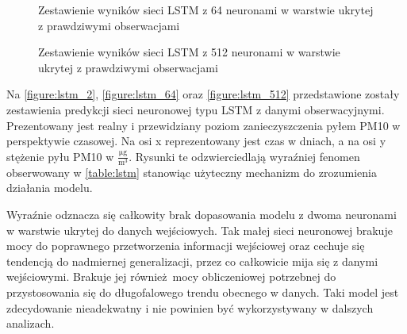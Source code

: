 \documentclass[10pt,a4paper]{article}
\begin{document}
\FloatBarrier
\begin{figure}[!ht]
	\centering
	\caption{Zestawienie wyników sieci LSTM z 64 neuronami w warstwie ukrytej z prawdziwymi obserwacjami}
	\label{figure:lstm_64}
\end{figure}
\FloatBarrier
\begin{figure}[!ht]
	\centering
	\caption{Zestawienie wyników sieci LSTM z 512 neuronami w warstwie ukrytej z prawdziwymi obserwacjami}
	\label{figure:lstm_512}
\end{figure}
\FloatBarrier

Na \autoref{figure:lstm_2}, \autoref{figure:lstm_64} oraz \autoref{figure:lstm_512} przedstawione zostały zestawienia predykcji sieci neuronowej typu LSTM z danymi obserwacyjnymi. Prezentowany jest realny i przewidziany poziom zanieczyszczenia pyłem PM10 w perspektywie czasowej. Na osi x reprezentowany jest czas w dniach, a na osi y stężenie pyłu PM10 w  $\frac{\si{\micro\gram}}{\si\meter^3}$. Rysunki te odzwierciedlają wyraźniej fenomen obserwowany w \autoref{table:lstm} stanowiąc użyteczny mechanizm do zrozumienia działania modelu. 

Wyraźnie odznacza się całkowity brak dopasowania modelu z dwoma neuronami w warstwie ukrytej do danych wejściowych. Tak małej sieci neuronowej brakuje mocy do poprawnego przetworzenia informacji wejściowej oraz cechuje się tendencją do nadmiernej generalizacji, przez co całkowicie mija się z danymi wejściowymi. Brakuje jej również mocy obliczeniowej potrzebnej do przystosowania się do długofalowego trendu obecnego w danych. Taki model jest zdecydowanie nieadekwatny i nie powinien być wykorzystywany w dalszych analizach. 
\end{document}
